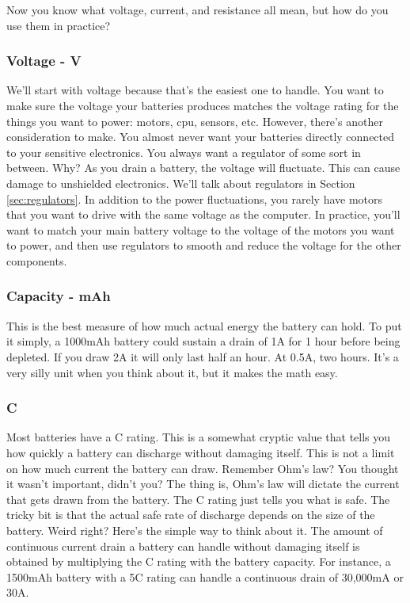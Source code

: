 Now you know what voltage, current, and resistance all mean, but how do you use them in practice? 

\subsubsection{Voltage - V}

We'll start with voltage because that's the easiest one to handle. You want to make sure the voltage your batteries produces matches the voltage rating for the things you want to power: motors, cpu, sensors, etc. However, there's another consideration to make. You almost never want your batteries directly connected to your sensitive electronics. You always want a regulator of some sort in between. Why? As you drain a battery, the voltage will fluctuate. This can cause damage to unshielded electronics. We'll talk about regulators in Section \ref{sec:regulators}. In addition to the power fluctuations, you rarely have motors that you want to drive with the same voltage as the computer. In practice, you'll want to match your main battery voltage to the voltage of the motors you want to power, and then use regulators to smooth and reduce the voltage for the other components.

\subsubsection{Capacity - mAh}

This is the best measure of how much actual energy the battery can hold. To put it simply, a 1000mAh battery could sustain a drain of 1A for 1 hour before being depleted. If you draw 2A it will only last half an hour. At 0.5A, two hours. It's a very silly unit when you think about it, but it makes the math easy.

\subsubsection{C}

Most batteries have a C rating. This is a somewhat cryptic value that tells you how quickly a battery can discharge without damaging itself. This is not a limit on how much current the battery can draw. Remember Ohm's law? You thought it wasn't important, didn't you? The thing is, Ohm's law will dictate the current that gets drawn from the battery. The C rating just tells you what is safe. The tricky bit is that the actual safe rate of discharge depends on the size of the battery. Weird right? Here's the simple way to think about it. The amount of continuous current drain a battery can handle without damaging itself is obtained by multiplying the C rating with the battery capacity. For instance, a 1500mAh battery with a 5C rating can handle a continuous drain of 30,000mA or 30A.


